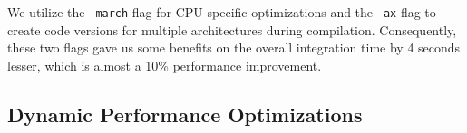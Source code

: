 We utilize the \texttt{-march} flag for CPU-specific optimizations and the \texttt{-ax} flag to create code versions for multiple architectures during compilation. Consequently, these two flags gave us some benefits on the overall integration time by 4 seconds lesser, which is almost a 10\% performance improvement. 


\subsection{Dynamic Performance Optimizations}






